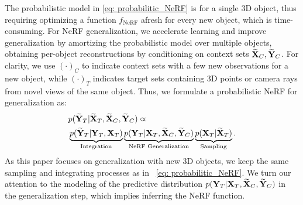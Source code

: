 The probabilistic model in \cref{eq: probabilitic_NeRF} is for a single 3D object, thus requiring optimizing a function $f_{\text{NeRF}}$ afresh for every new object, which is time-consuming. For NeRF generalization, we accelerate learning and improve generalization by amortizing the probabilistic model over multiple objects, obtaining per-object reconstructions by conditioning on context sets ${{\widetilde {\bf{X}}}_C, {\widetilde {\bf{Y}}}_C}$.
For clarity, we use ${(\cdot)}_{C}$ to indicate context sets with {a few new observations for a new object}, while ${(\cdot)}_{T}$ indicates target sets containing 3D points or camera rays from novel views of the same object.
Thus, we formulate a probabilistic NeRF for generalization as:
%
\begin{equation}
\begin{aligned}
    &p({\bf{\widetilde{Y}}}_{T} | {\bf{\widetilde{X}}}_{T}, {\bf{\widetilde{X}}}_{C}, {\bf{\widetilde{Y}}}_{C}) \varpropto \\
&    \underbrace{p({\bf{\widetilde{Y}}}_{T} | {\bf{{Y}}}_{T}, {\bf{{X}}}_{T})}_{\text{Integration}}
    \underbrace{p({\bf{{Y}}}_{T} | {\bf{{X}}}_{T}, {\bf{\widetilde{X}}}_{C}, {\bf{\widetilde{Y}}}_{C})}_{\text{NeRF Generalization}}
    \underbrace{p({\bf{{X}}}_{T} | {\bf{\widetilde{X}}}_{T})}_{\text{Sampling}}.
\end{aligned}
\label{eq: probabilitic_NeRF_generalization}
\end{equation}
%
As this paper focuses on generalization with new 3D objects, we keep the same sampling and integrating processes as in ~\cref{eq: probabilitic_NeRF}. We turn our attention to the modeling of the predictive distribution $p({\bf{{Y}}}_{T}| {\bf{{X}}}_{T}, {\bf{\widetilde{X}}}_{C}, {\bf{\widetilde{Y}}}_{C})$ in the generalization step, which implies inferring the NeRF function.

